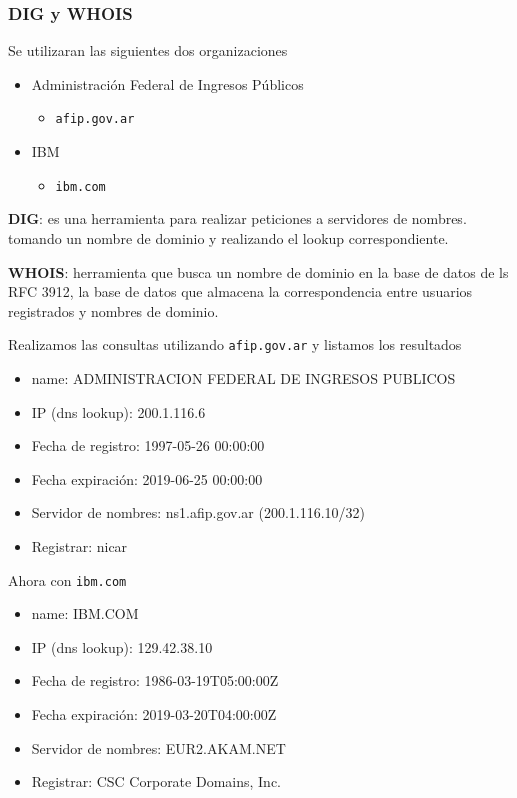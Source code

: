 \subsubsection*{DIG y WHOIS}

Se utilizaran las siguientes dos organizaciones

\begin{itemize}
    \item Administración Federal de Ingresos Públicos
        \begin{itemize}
            \item \texttt{afip.gov.ar}
        \end{itemize}
    \item IBM
        \begin{itemize}
            \item \texttt{ibm.com} 
        \end{itemize}
\end{itemize}

\textbf{DIG}: es una herramienta para realizar peticiones a servidores de nombres. tomando un nombre de dominio y realizando el lookup correspondiente.

\textbf{WHOIS}: herramienta que busca un nombre de dominio en la base de datos de ls RFC 3912, la base de datos que almacena la correspondencia entre usuarios registrados y nombres de dominio.

Realizamos las consultas utilizando \texttt{afip.gov.ar} y listamos los resultados

\begin{itemize}
    \item name: ADMINISTRACION FEDERAL DE INGRESOS PUBLICOS
    \item IP (dns lookup): 200.1.116.6
    \item Fecha de registro:  1997-05-26 00:00:00
    \item Fecha expiración: 2019-06-25 00:00:00
    \item Servidor de nombres: ns1.afip.gov.ar (200.1.116.10/32)
    \item Registrar: nicar
\end{itemize}

Ahora con \texttt{ibm.com} 

\begin{itemize}
    \item name: IBM.COM
    \item IP (dns lookup): 129.42.38.10
    \item Fecha de registro: 1986-03-19T05:00:00Z
    \item Fecha expiración: 2019-03-20T04:00:00Z
    \item Servidor de nombres: EUR2.AKAM.NET
    \item Registrar: CSC Corporate Domains, Inc.
\end{itemize}

